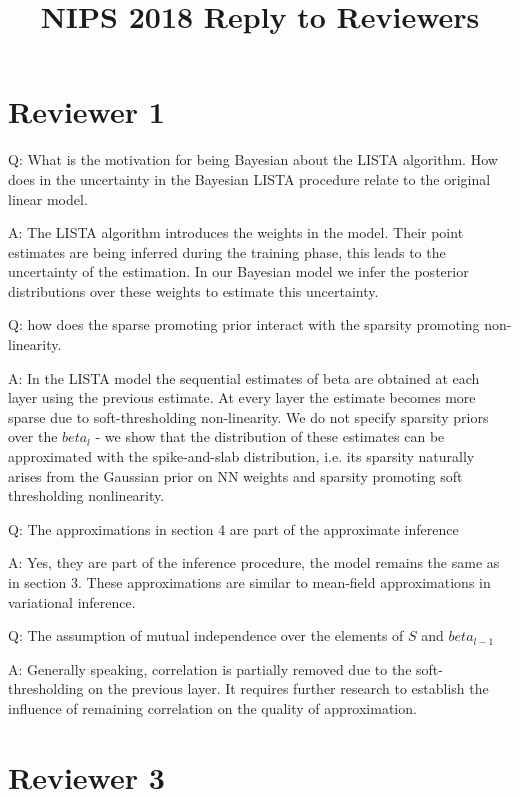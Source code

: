 \documentclass{article}
\begin{document}
\title{NIPS 2018 Reply to Reviewers}
\date{}
\maketitle

\section*{Reviewer 1}
Q: What is the motivation for being Bayesian about the LISTA algorithm. How does in the uncertainty in the Bayesian LISTA procedure relate to the original linear model.

A: The LISTA algorithm introduces the weights in the model. Their point estimates are being inferred during the training phase, this leads to the uncertainty of the estimation. In our Bayesian model we infer the posterior distributions over these weights to estimate this uncertainty.
\newline
\newline

Q: how does the sparse promoting prior interact with the sparsity promoting non-linearity.

A: In the LISTA model the sequential estimates of beta are obtained at each layer using the previous estimate. At every layer the estimate becomes more sparse due to soft-thresholding non-linearity. We do not specify sparsity priors over the $beta_l$ - we show that the distribution of these estimates can be approximated with the spike-and-slab distribution, i.e. its sparsity naturally arises from the Gaussian prior on NN weights and sparsity promoting soft thresholding nonlinearity.
\newline
\newline

Q: The approximations in section 4 are part of the approximate inference

A: Yes, they are part of the inference procedure, the model remains the same as in section 3. These approximations are similar to mean-field approximations in variational inference.
\newline
\newline

Q: The assumption of mutual independence over the elements of $S$ and $beta_{l-1}$

A: Generally speaking, correlation is partially removed due to the soft-thresholding on the previous layer. It requires further research to establish the influence of remaining correlation on the quality of approximation.
\newline
\newline

\section*{Reviewer 3}
\end{document}
